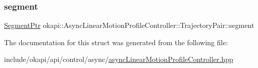 \mbox{\label{structokapi_1_1AsyncLinearMotionProfileController_1_1TrajectoryPair_a288d267243a16f96a8ba701b0adc1722}} 
\subsubsection{\texorpdfstring{segment}{segment}}
{\footnotesize\ttfamily \mbox{\hyperlink{classokapi_1_1AsyncLinearMotionProfileController_a714a13979ef81d5fbca93264d044b8cc}{Segment\+Ptr}} okapi\+::\+Async\+Linear\+Motion\+Profile\+Controller\+::\+Trajectory\+Pair\+::segment}



The documentation for this struct was generated from the following file\+:\begin{DoxyCompactItemize}
\item 
include/okapi/api/control/async/\mbox{\hyperlink{asyncLinearMotionProfileController_8hpp}{async\+Linear\+Motion\+Profile\+Controller.\+hpp}}\end{DoxyCompactItemize}
